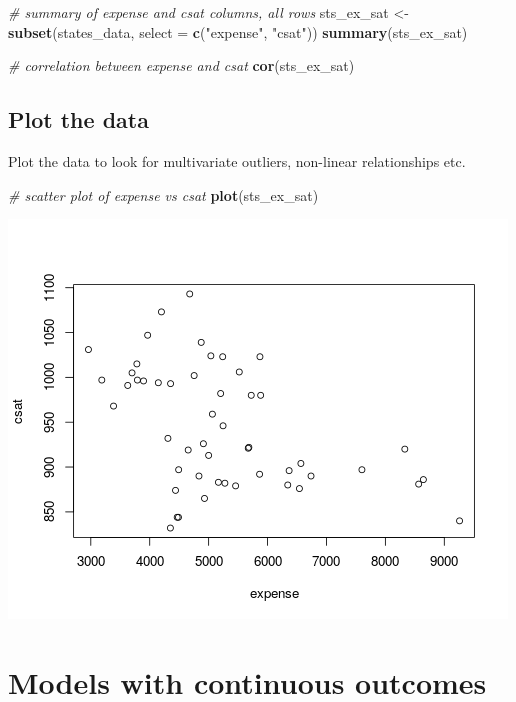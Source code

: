 \documentclass[]{book}
\newenvironment{Shaded}{\begin{snugshade}}{\end{snugshade}}
\newcommand{\CommentTok}[1]{\textcolor[rgb]{0.56,0.35,0.01}{\textit{#1}}}
\newcommand{\DataTypeTok}[1]{\textcolor[rgb]{0.13,0.29,0.53}{#1}}
\newcommand{\KeywordTok}[1]{\textcolor[rgb]{0.13,0.29,0.53}{\textbf{#1}}}
\newcommand{\NormalTok}[1]{#1}
\newcommand{\StringTok}[1]{\textcolor[rgb]{0.31,0.60,0.02}{#1}}
\begin{document}
\begin{Shaded}
\begin{Highlighting}[]
  \CommentTok{# summary of expense and csat columns, all rows}
\NormalTok{  sts_ex_sat <-}\StringTok{ }\KeywordTok{subset}\NormalTok{(states_data, }\DataTypeTok{select =} \KeywordTok{c}\NormalTok{(}\StringTok{"expense"}\NormalTok{, }\StringTok{"csat"}\NormalTok{))}
  \KeywordTok{summary}\NormalTok{(sts_ex_sat)}

  \CommentTok{# correlation between expense and csat}
  \KeywordTok{cor}\NormalTok{(sts_ex_sat) }
\end{Highlighting}
\end{Shaded}

\hypertarget{plot-the-data}{%
\subsection{Plot the data}\label{plot-the-data}}

Plot the data to look for multivariate outliers, non-linear relationships etc.

\begin{Shaded}
\begin{Highlighting}[]
  \CommentTok{# scatter plot of expense vs csat}
  \KeywordTok{plot}\NormalTok{(sts_ex_sat)}
\end{Highlighting}
\end{Shaded}

\includegraphics{R/Rmodels/images/statesCorr1.png}

\hypertarget{models-with-continuous-outcomes}{%
\section{Models with continuous outcomes}\label{models-with-continuous-outcomes}}
\end{document}
